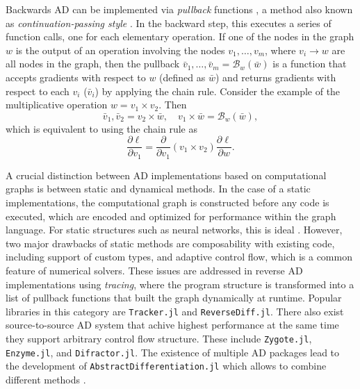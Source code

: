 Backwards AD can be implemented via \textit{pullback} functions \cite{Innes_2018}, a method also known as \textit{continuation-passing style} \cite{Wang_Zheng_Decker_Wu_Essertel_Rompf_2019}.
In the backward step, this executes a series of function calls, one for each elementary operation.
If one of the nodes in the graph $w$ is the output of an operation involving the nodes $v_1, \ldots, v_m$, where $v_i \rightarrow w$ are all nodes in the graph, then the pullback $\bar v_1, \ldots, \bar v_m = \mathcal B_w(\bar w)$ is a function that accepts gradients with respect to $w$ (defined as $\bar w$) and returns gradients with respect to each $v_i$ ($\bar v_i$) by applying the chain rule. 
Consider the example of the multiplicative operation $w = v_1 \times v_2$. Then
\begin{equation}
 \bar v_1, \bar v_2 = v_2 \times \bar w , \quad
 v_1 \times \bar w = \mathcal{B}_w (\bar w),
\end{equation}
which is equivalent to using the chain rule as
\begin{equation}
 \frac{\partial \ell}{\partial v_1} = \frac{\partial}{\partial v_1}(v_1 \times v_2) \frac{\partial \ell}{\partial w}.
\end{equation}



A crucial distinction between AD implementations based on computational graphs is between static and dynamical methods\cite{Baydin_Pearlmutter_Radul_Siskind_2015}. 
In the case of a static implementations, the computational graph is constructed before any code is executed, which are encoded and optimized for performance within the graph language. 
For static structures such as neural networks, this is ideal \cite{abadi-tensorflow}. 
However, two major drawbacks of static methods are composability with existing code, including support of custom types, and adaptive control flow, which is a common feature of numerical solvers. 
These issues are addressed in reverse AD implementations using \textit{tracing}, where the program structure is transformed into a list of pullback functions that built the graph dynamically at runtime. 
Popular libraries in this category are \texttt{Tracker.jl} and \texttt{ReverseDiff.jl}.
There also exist source-to-source AD system that achive highest performance at the same time they support arbitrary control flow structure. 
These include \texttt{Zygote.jl}\cite{Innes_Zygote}, \texttt{Enzyme.jl}\cite{moses_Enzyme}, and \texttt{Difractor.jl}.
The existence of multiple AD packages lead to the development of \texttt{AbstractDifferentiation.jl} which allows to combine different methods \cite{Schäfer_Tarek_White_Rackauckas_2021}. 



